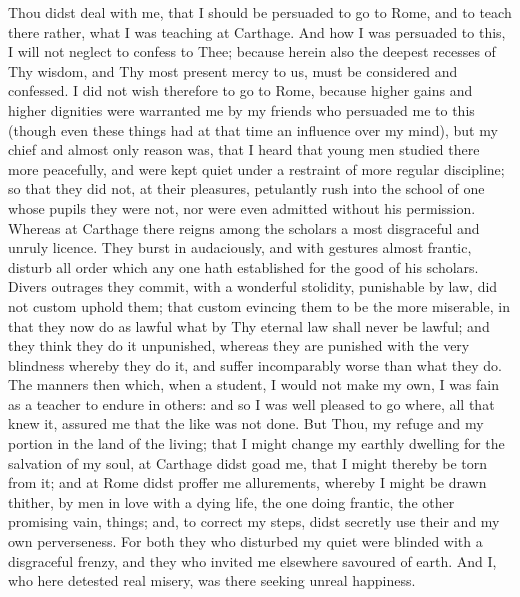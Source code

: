 \documentclass[b5paper,openright,12pt,twoside]{book}
\begin{document}
Thou didst deal with me, that I should be persuaded to go to Rome, and
to teach there rather, what I was teaching at Carthage. And how I was
persuaded to this, I will not neglect to confess to Thee; because herein
also the deepest recesses of Thy wisdom, and Thy most present mercy to
us, must be considered and confessed. I did not wish therefore to go to
Rome, because higher gains and higher dignities were warranted me by my
friends who persuaded me to this (though even these things had at that
time an influence over my mind), but my chief and almost only reason
was, that I heard that young men studied there more peacefully, and were
kept quiet under a restraint of more regular discipline; so that they
did not, at their pleasures, petulantly rush into the school of
one whose pupils they were not, nor were even admitted without his
permission. Whereas at Carthage there reigns among the scholars a most
disgraceful and unruly licence. They burst in audaciously, and
with gestures almost frantic, disturb all order which any one hath
established for the good of his scholars. Divers outrages they commit,
with a wonderful stolidity, punishable by law, did not custom uphold
them; that custom evincing them to be the more miserable, in that they
now do as lawful what by Thy eternal law shall never be lawful; and they
think they do it unpunished, whereas they are punished with the very
blindness whereby they do it, and suffer incomparably worse than what
they do. The manners then which, when a student, I would not make my
own, I was fain as a teacher to endure in others: and so I was well
pleased to go where, all that knew it, assured me that the like was not
done. But Thou, my refuge and my portion in the land of the living;
that I might change my earthly dwelling for the salvation of my soul,
at Carthage didst goad me, that I might thereby be torn from it; and at
Rome didst proffer me allurements, whereby I might be drawn thither,
by men in love with a dying life, the one doing frantic, the other
promising vain, things; and, to correct my steps, didst secretly use
their and my own perverseness. For both they who disturbed my quiet were
blinded with a disgraceful frenzy, and they who invited me elsewhere
savoured of earth. And I, who here detested real misery, was there
seeking unreal happiness.
\end{document}

